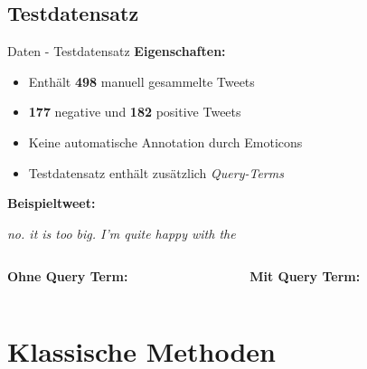 \documentclass[aspectratio=169]{beamer}
\begin{document}
\subsection{Testdatensatz}

\begin{frame}{Daten - Testdatensatz}
	\textbf{Eigenschaften:}
	\begin{itemize}
		\item Enthält \textbf{498} manuell gesammelte Tweets
		\item \textbf{177} negative und \textbf{182} positive Tweets
		\item Keine automatische Annotation durch Emoticons
		\item Testdatensatz enthält zusätzlich \textit{Query-Terms}
	\end{itemize}

	\vspace{0.5cm}
	\textbf{Beispieltweet:}

	\begin{center}
		\glqq \textit{no. it is too big. I'm quite happy with the \grqq}
		\vspace{0.25cm}
		\begin{columns}
			\begin{column}{0.45\textwidth}
				\textbf{Ohne Query Term: }
			\end{column}
			\begin{column}{0.45\textwidth}
				\textbf{Mit Query Term: }
			\end{column}
		\end{columns}
	\end{center}
\end{frame}


\section{Klassische Methoden}
\end{document}

